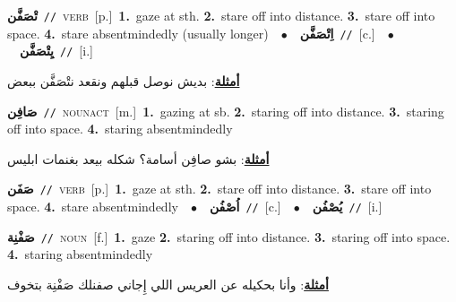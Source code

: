 \documentclass[10pt,a4paper,twoside]{article} %
\begin{document}
\begin{multicols}{2}
{\setlength\topsep{0pt}\textbf{\foreignlanguage{arabic}{تْصَفَّن}}\ {\color{gray}\texttt{//}\color{black}}\ \textsc{verb}\ [p.]\ \textbf{1.}~gaze at sth.  \textbf{2.}~stare off into distance.  \textbf{3.}~stare off into space.  \textbf{4.}~stare absentmindedly (usually longer)\ \ $\bullet$\ \ \setlength\topsep{0pt}\textbf{\foreignlanguage{arabic}{اِتْصَفَّن}}\ {\color{gray}\texttt{//}\color{black}}\ [c.]\ \ $\bullet$\ \ \setlength\topsep{0pt}\textbf{\foreignlanguage{arabic}{يِتْصَفَّن}}\ {\color{gray}\texttt{//}\color{black}}\ [i.]\  \begin{flushright}\color{gray}\foreignlanguage{arabic}{\textbf{\underline{\foreignlanguage{arabic}{أمثلة}}}: بديش نوصل قبلهم ونقعد نتْصَفَّن ببعض}\end{flushright}\color{black}} \vspace{2mm}

{\setlength\topsep{0pt}\textbf{\foreignlanguage{arabic}{صَافِن}}\ {\color{gray}\texttt{//}\color{black}}\ \textsc{noun\textunderscore act}\ [m.]\ \textbf{1.}~gazing at sb.  \textbf{2.}~staring off into distance.  \textbf{3.}~staring off into space.  \textbf{4.}~staring absentmindedly\  \begin{flushright}\color{gray}\foreignlanguage{arabic}{\textbf{\underline{\foreignlanguage{arabic}{أمثلة}}}: بشو صافِن أسامة؟ شكله بيعد بغنمات ابليس}\end{flushright}\color{black}} \vspace{2mm}

{\setlength\topsep{0pt}\textbf{\foreignlanguage{arabic}{صَفَن}}\ {\color{gray}\texttt{//}\color{black}}\ \textsc{verb}\ [p.]\ \textbf{1.}~gaze at sth.  \textbf{2.}~stare off into distance.  \textbf{3.}~stare off into space.  \textbf{4.}~stare absentmindedly\ \ $\bullet$\ \ \setlength\topsep{0pt}\textbf{\foreignlanguage{arabic}{اُصْفُن}}\ {\color{gray}\texttt{//}\color{black}}\ [c.]\ \ $\bullet$\ \ \setlength\topsep{0pt}\textbf{\foreignlanguage{arabic}{يُصْفُن}}\ {\color{gray}\texttt{//}\color{black}}\ [i.]\ } \vspace{2mm}

{\setlength\topsep{0pt}\textbf{\foreignlanguage{arabic}{صَفْنِة}}\ {\color{gray}\texttt{//}\color{black}}\ \textsc{noun}\ [f.]\ \textbf{1.}~gaze  \textbf{2.}~staring off into distance.  \textbf{3.}~staring off into space.  \textbf{4.}~staring absentmindedly\  \begin{flushright}\color{gray}\foreignlanguage{arabic}{\textbf{\underline{\foreignlanguage{arabic}{أمثلة}}}: وأنا بحكيله عن العريس اللي إِجاني صفنلك صَفْنِة بتخوف}\end{flushright}\color{black}} \vspace{2mm}


\end{multicols}
\end{document}
